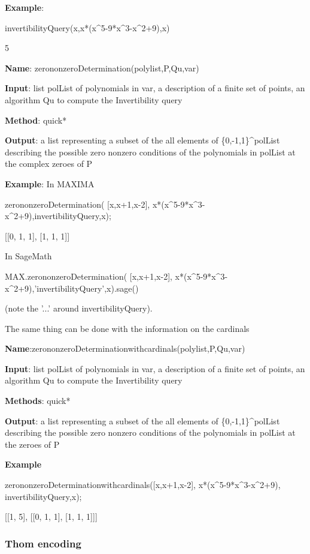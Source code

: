 \documentclass{article}
\begin{document}
{\bf Example}:
  
invertibilityQuery(x,x*(x\^{}5-9*x\^{}3-x\^{}2+9),x)
  
  5
  



{\bf Name}:
zerononzeroDetermination(polylist,P,Qu,var)

{\bf Input}: list polList of polynomials in var, a description of a finite set of
points, an algorithm Qu to compute the Invertibility query

{\bf Method}: quick*

{\bf Output}: a list representing a subset of the all elements of
\{0,-1,1\}\^{}polList describing the possible zero nonzero conditions of the
polynomials in polList at the complex zeroes of P

{\bf Example}: In MAXIMA

zerononzeroDetermination( [x,x+1,x-2], x*(x\^{}5-9*x\^{}3-x\^{}2+9),invertibilityQuery,x);
  
  [[0, 1, 1], [1, 1, 1]]

\noindent In SageMath

MAX.zerononzeroDetermination( [x,x+1,x-2], x*(x\^{}5-9*x\^{}3-x\^{}2+9),'invertibilityQuery',x).sage()
  
  \noindent (note the '...' around invertibilityQuery).

The same thing can be done with the information on the cardinals


{\bf Name}:zerononzeroDeterminationwithcardinals(polylist,P,Qu,var)

{\bf Input}: list polList of polynomials in var, a description of a finite set of
points, an algorithm Qu to compute the Invertibility query

{\bf Methods}: quick*
  
{\bf Output}: a list representing a subset of the all elements of
\{0,-1,1\}\^{}polList describing the possible zero nonzero conditions of the
polynomials in polList at the zeroes of P

{\bf Example}

zerononzeroDeterminationwithcardinals([x,x+1,x-2], x*(x\^{}5-9*x\^{}3-x\^{}2+9),
  invertibilityQuery,x);
  
  [[1, 5], [[0, 1, 1], [1, 1, 1]]]
 

\subsubsection{Thom encoding}
\end{document}
